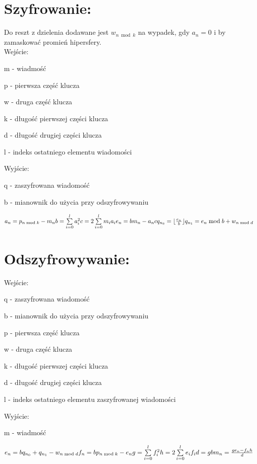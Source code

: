\documentclass[11pt]{article}
\newcommand{\floor}[1]{\lfloor #1 \rfloor}
\begin{document}
	\section{Szyfrowanie:}
	Do reszt z dzielenia dodawane jest \ensuremath{w_{n\bmod{k}}} na wypadek, gdy \ensuremath{a_n = 0} i by zamaskować promień hipersfery. \\
	Wejście:
	\begin{description}
	\item m - wiadmość
	\item p - pierwsza część klucza
	\item w - druga część klucza
	\item k - długość pierwszej części klucza
	\item d - długość drugiej części klucza
	\item l - indeks ostatniego elementu wiadomości
	\end{description}
	Wyjście:
	\begin{description}
	\item q - zaszyfrowana wiadomość
	\item b - mianownik do użycia przy odszyfrowywaniu
	\end{description} 
	\ensuremath {
		a_n = p_{n \bmod{k}} - m_n \\
		b = \sum\limits_{i=0}^l a_i^2 \\
		c = 2\sum\limits_{i=0}^l m_ia_i \\
		e_n = bm_n - a_nc \\
		q_{n_0} = \floor{\frac{e_n}{b}}  \\
		q_{n_1} = e_n\bmod{b} + w_{n\bmod{d}} 
	}
	\newpage
	\section{Odszyfrowywanie:}
	Wejście:
	\begin{description}
	\item q - zaszyfrowana wiadomość
	\item b - mianownik do użycia przy odszyfrowywaniu
	\item p - pierwsza część klucza
	\item w - druga część klucza
	\item k - długość pierwszej części klucza
	\item d - długość drugiej części klucza
	\item l - indeks ostatniego elementu zaszyfrowanej wiadomości
	\end{description} 
	Wyjście:
	\begin{description}
	\item m - wiadmość
	\end{description}
	\ensuremath {
		e_n = bq_{n_0} + q_{n_1} - w_{n\bmod{d}} \\
		f_n = bp_{n \bmod{k}} - e_n \\
		g = \sum\limits_{i=0}^l f_i^2 \\
		h = 2\sum\limits_{i=0}^l e_if_i \\
		d = gb \\
		m_n = \frac{ge_n - f_nh}{d}
	}
\end{document}
